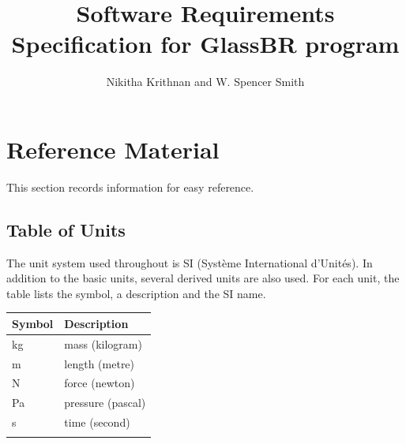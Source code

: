 \documentclass[12pt]{article}
\title{Software Requirements Specification for GlassBR program}
\author{Nikitha Krithnan and W. Spencer Smith}
\begin{document}
\maketitle
\tableofcontents
\newpage
\section{Reference Material}
\label{Sec:RefMat}
This section records information for easy reference.
\subsection{Table of Units}
\label{Sec:ToU}
The unit system used throughout is SI (Système International d'Unités). In addition to the basic units, several derived units are also used. For each unit, the table lists the symbol, a description and the SI name.
\begin{longtable*}{l l}
\toprule
Symbol & Description
\\
\midrule
kg & mass (kilogram)
\\
m & length (metre)
\\
N & force (newton)
\\
Pa & pressure (pascal)
\\
s & time (second)
\\
\bottomrule
\label{Table:ToU}
\end{longtable*}
\end{document}
